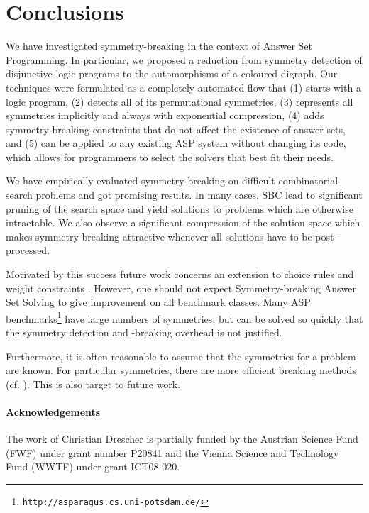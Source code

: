 \documentclass[envcountsame]{llncs}
\begin{document}
\section{Conclusions \label{sec:con}}
We have investigated symmetry-breaking in the context of Answer Set Programming. In particular, we proposed a reduction from symmetry detection of disjunctive logic programs to the automorphisms of a coloured digraph. Our techniques were formulated as a completely automated flow that (1) starts with a logic program, (2) detects all of its permutational symmetries, (3) represents all symmetries implicitly and always with exponential compression, (4) adds symmetry-breaking constraints that do not affect the existence of answer sets, and (5) can be applied to any existing ASP system without changing its code, which allows for programmers to select the solvers that best fit their needs.

We have empirically evaluated symmetry-breaking on difficult combinatorial search problems and got promising results. In many cases, SBC lead to significant pruning of the search space and yield solutions to problems which are otherwise intractable.
We also observe a significant compression of the solution space which makes symmetry-breaking attractive whenever all solutions have to be post-processed.

Motivated by this success future work concerns an extension to choice rules and weight constraints \cite{siniso02a}.
However, one should not expect Symmetry-breaking Answer Set Solving to give improvement on all benchmark classes. Many ASP benchmarks\footnote{\texttt{http://asparagus.cs.uni-potsdam.de/}} have large numbers of symmetries, but can be solved so quickly that the symmetry detection and -breaking overhead is not justified.

Furthermore, it is often reasonable to assume that the symmetries for a problem are known. For particular symmetries, there are more efficient breaking methods (cf. \cite{wa06a}). This is also target to future work.

\paragraph*{Acknowledgements} The work of Christian Drescher is partially funded by the Austrian Science Fund (FWF) under grant number P20841 and the Vienna Science and Technology Fund (WWTF) under grant ICT08-020.
\end{document}
